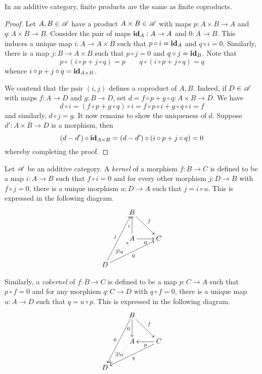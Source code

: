 \begin{proposition}
    In an additive category, finite products are the same as finite coproducts.
\end{proposition}
\begin{proof}
    Let $A,B\in\mathscr A$ have a product $A\times B\in\mathscr A$ with maps $p: A\times B\to A$ and $q: A\times B\to B$. Consider the pair of maps $\mathbf{id}_A: A\to A$ and $0: A\to B$. This induces a unique map $i: A\to A\times B$ such that $p\circ i = \mathbf{id}_A$ and $q\circ i = 0$. Similarly, there is a map $j: B\to A\times B$ such that $p\circ j = 0$ and $q\circ j = \mathbf{id}_B$. Note that 
    \begin{equation*}
        p\circ(i\circ p + j\circ q) = p \qquad q\circ(i\circ p + j\circ q) = q
    \end{equation*}
    whence $i\circ p + j\circ q = \mathbf{id}_{A\times B}$.

    We contend that the pair $(i,j)$ defines a coproduct of $A, B$. Indeed, if $D\in\mathscr A$ with maps $f: A\to D$ and $g: B\to D$, set $d = f\circ p + g\circ q: A\times B\to D$. We have 
    \begin{equation*}
        d\circ i = (f\circ p + g\circ q)\circ i = f\circ p\circ i + g\circ q\circ i = f
    \end{equation*}
    and similarly, $d\circ j = g$. It now remains to show the uniqueness of $d$. Suppose $d': A\times B\to D$ is a morphism, then 
    \begin{equation*}
        (d - d')\circ\mathbf{id}_{A\times B} = (d - d')\circ(i\circ p + j\circ q) = 0
    \end{equation*}
    whereby completing the proof. 
\end{proof}

\begin{definition}
    Let $\mathscr A$ be an additive category. A \emph{kernel} of a morphism $f: B\to C$ is defined to be a map $i: A\to B$ such that $f\circ i = 0$ and for every other morphism $j: D\to B$ with $f\circ j = 0$, there is a unique morphism $u: D\to A$ such that $j = i\circ u$. This is expressed in the following diagram.
    \begin{equation*}
        \xymatrix {
            & B\ar[rd]^f & \\
            & A\ar[u]^i\ar[r]_0 & C\\
            D\ar[ruu]^j\ar@{.>}[ru]|-{\exists! u}\ar[rru]_0 & & 
        }
    \end{equation*}

    Similarly, a \emph{cokernel} of $f: B\to C$ is defined to be a map $p: C\to A$ such that $p\circ f = 0$ and for any morphism $q: C\to D$ with $q\circ f = 0$, there is a unique map $u: A\to D$ such that $q = u\circ p$. This is expressed in the following diagram.
    \begin{equation*}
        \xymatrix {
            & B\ar[rd]^f\ar[d]_0\ar[ldd]_0 & \\
            & A\ar@{.>}[ld]|-{\exists!u} & C\ar[l]^p\ar[lld]^q\\
            D & & 
        }
    \end{equation*}
\end{definition}

